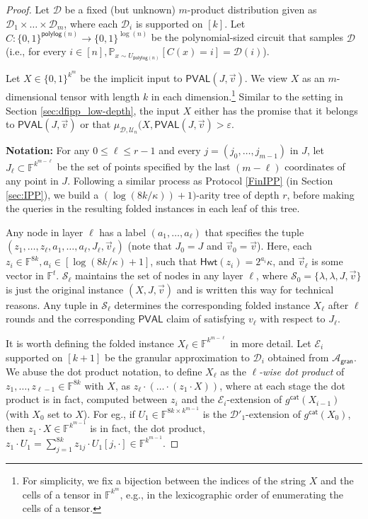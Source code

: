 \documentclass[11pt]{article}
\newcommand{\polylog}{\mathsf{polylog}}
\newcommand{\PVAL}{\mathsf{PVAL}}
\newcommand{\Hamming}{\mathsf{Hwt}}
\newcommand{\gran}{\mathsf{gran}}
\newcommand{\F}{\mathbb{F}}
\newcommand{\sU}{\mathcal{U}}
\newcommand{\sD}{\mathcal{D}}
\newcommand{\sA}{\mathcal{A}}
\begin{document}
\begin{proof}
Let $\sD$ be a fixed (but unknown) $m$-product distribution given as $\sD_1 \times \dots \times \sD_m$, where each $\sD_i$ is supported on $[k]$. Let $C : \{0,1\}^{\polylog (n)} \rightarrow \{0,1\}^{\log (n)}$ be the polynomial-sized circuit that samples $\sD$ (i.e., for every $i \in [n], \mathbb{P}_{x \sim U_{\polylog (n)}} \left[ C(x) = i \right] = \sD(i)$).

Let $X \in \{0,1\}^{k^m}$ be the implicit input to $\PVAL(J,\Vec{v})$. We view $X$ as an $m$-dimensional tensor with length $k$ in each dimension.\footnote{For simplicity, we fix a bijection between the indices of the string $X$ and the cells of a tensor in $\F^{k^m}$, e.g., in the lexicographic order of enumerating the cells of a tensor.} Similar to the setting in Section \ref{sec:dfipp_low-depth}, the input $X$ either has the promise that it belongs to $\PVAL(J,\Vec{v})$ or that $\mu_{\sD, \sU_n}(X,\PVAL(J,\Vec{v}) > \varepsilon$. 

\vspace{0.05in}
\textbf{Notation:}  For any $0 \leq \ell \leq r-1$ and every $j = (j_0, \dots, j_{m-1})$ in $J$, let $J_\ell \subset \F^{k^{m-\ell}}$ be the set of points specified by the last $(m-\ell)$ coordinates of any point in $J$. Following a similar process as Protocol \ref{FinIPP} (in Section \ref{sec:IPP}), we build a $(\log (8k/\kappa))+1)$-arity tree of depth $r$, before making the queries in the resulting folded instances in each leaf of this tree. 

Any node in layer $\ell$ has a label $(a_1, \dots, a_\ell)$ that specifies the tuple $(z_1, \dots, z_\ell, a_1, \dots, a_\ell, J_\ell, \Vec{v}_\ell)$ (note that $J_0 = J$ and $\Vec{v}_0 = \Vec{v}$). Here, each $z_i \in \F^{8k}, a_i \in [\log (8k/\kappa)+1]$, such that $\Hamming(z_i) = 2^{a_i}\kappa$, and $\Vec{v}_\ell$ is some vector in $\F^t$. $\mathcal{S}_\ell$ maintains the set of nodes in any layer $\ell$, where $\mathcal{S}_0 = \{\lambda, \lambda, J, \Vec{v}\}$ is just the original instance $(X,J,\Vec{v})$ and is written this way for technical reasons. Any tuple in $\mathcal{S}_\ell$ determines the corresponding folded instance $X_\ell$ after $\ell$ rounds and the corresponding $\PVAL$ claim of satisfying $v_\ell$ with respect to $J_{\ell}$.

It is worth defining the folded instance $X_\ell \in \F^{k^{m-\ell}}$ in more detail. Let $\mathcal{E}_i$ supported on $[k+1]$ be the granular approximation to $\sD_i$ obtained from $\sA_\gran$. We abuse the dot product notation, to define $X_\ell$ as the \textit{$\ell$-wise dot product} of $z_1, \dots, z_{\ell-1} \in \F^{8k}$ with $X$, as $z_\ell \cdot (\dots \cdot (z_1 \cdot X))$, where at each stage the dot product is in fact, computed between $z_i$ and the $\mathcal{E}_{i}$-extension of $g^{\mathsf{cat}} (X_{i-1})$ (with $X_0$ set to $X$). For eg., if $U_1 \in \F^{8k \times k^{m-1}}$ is the $\sD'_1$-extension of $g^{\mathsf{cat}}(X_0)$, then $z_1 \cdot X \in \F^{k^{m-1}}$ is in fact, the dot product, $z_1 \cdot U_1 = \sum_{j=1}^{8k} z_{1j} \cdot U_1[j,\cdot] \in \F^{k^{m-1}}$.


\end{proof}
\end{document}
